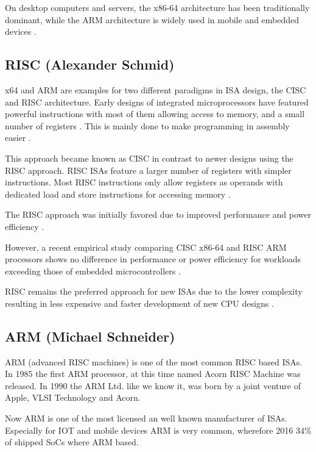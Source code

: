 \documentclass[conference]{IEEEtran}
\begin{document}
	On desktop computers and servers, the x86-64 architecture has been traditionally dominant,
	while the ARM architecture is widely used in mobile and embedded devices \cite{Blem2013}.

	\subsection{RISC (Alexander Schmid)}
	x64 and ARM are examples for two different paradigms in \gls{ISA} design, the \gls{CISC} and \gls{RISC} architecture.
	Early designs of integrated microprocessors have featured powerful instructions with most of them allowing access to memory,
	and a small number of registers \cite{George1990}. This is mainly done to make programming in assembly easier \cite[page 73]{Stokes2006}.

	This approach became known as \gls{CISC} in contrast to newer designs using the \gls{RISC} approach.
	\gls{RISC} \glspl{ISA} feature a larger number of registers with simpler instructions.
	Most \gls{RISC} instructions only allow registers as operands with dedicated load and store instructions for accessing memory \cite{George1990}.

	The \gls{RISC} approach was initially favored due to improved performance and power efficiency \cite{George1990}.
	
	However, a recent empirical study comparing \gls{CISC} x86-64 and \gls{RISC} ARM processors shows no difference in performance or power efficiency
	for workloads exceeding those of embedded microcontrollers \cite{Blem2013}.

	\gls{RISC} remains the preferred approach for new \glspl{ISA} due to the lower complexity resulting in less expensive and faster
	development of new CPU designs \cite{George1990}. 

	\subsection{ARM (Michael Schneider)}
	ARM (advanced RISC machines) is one of the most common \gls{RISC} based \glspl{ISA}. In 1985 the first ARM processor, at this time named Acorn RISC Machine was released. In 1990 the ARM Ltd. like we know it, was born by a joint venture of Apple, VLSI Technology and Acorn. \cite{Levy2005}

	 Now ARM is one of the most licensed an well known manufacturer of \glspl{ISA}. Especially for IOT and mobile devices ARM is very common, wherefore 2016 34\% of shipped SoCs where ARM based. \cite{Holdings2018}
\end{document}
